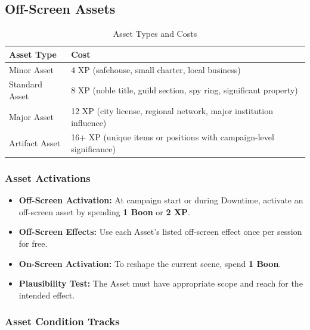 \subsection{Off-Screen Assets}\label{subsec:off_screen_assets}

\begin{longtable}{p{4cm} p{9cm}}
\caption{Asset Types and Costs}\label{tab:asset_types}\\
\toprule
\textbf{Asset Type} & \textbf{Cost} \\
\midrule
Minor Asset & 4 XP (safehouse, small charter, local business) \\
Standard Asset & 8 XP (noble title, guild section, spy ring, significant property) \\
Major Asset & 12 XP (city license, regional network, major institution influence) \\
Artifact Asset & 16+ XP (unique items or positions with campaign-level significance) \\
\bottomrule
\end{longtable}

\subsubsection{Asset Activations}\label{subsec:asset_activations}

\begin{itemize}
    \item \textbf{Off-Screen Activation:} At campaign start or during Downtime, activate an off-screen asset by spending \textbf{1 Boon} or \textbf{2 XP}.
    \item \textbf{Off-Screen Effects:} Use each Asset's listed off-screen effect once per session for free.
    \item \textbf{On-Screen Activation:} To reshape the current scene, spend \textbf{1 Boon}.
    \item \textbf{Plausibility Test:} The Asset must have appropriate scope and reach for the intended effect.
\end{itemize}

\subsubsection{Asset Condition Tracks}\label{subsec:asset_conditions}

